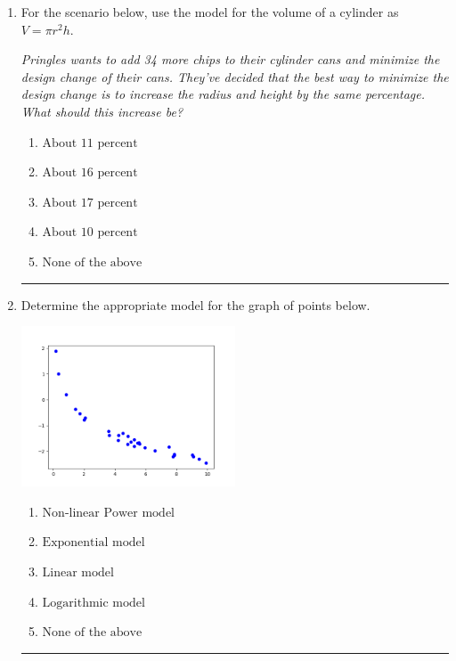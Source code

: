 \documentclass[14pt]{extbook}
\newcommand{\litem}[1]{\item#1\hspace*{-1cm}\rule{\textwidth}{0.4pt}}
\begin{document}
\begin{enumerate}
{\begin{enumerate}[label=\Alph*.]
\end{enumerate} }
\litem{
For the scenario below, use the model for the volume of a cylinder as $V = \pi r^2 h$.
\begin{center}
    \textit{ Pringles wants to add 34 \text{percent} more chips to their cylinder cans and minimize the design change of their cans. They've decided that the best way to minimize the design change is to increase the radius and height by the same percentage. What should this increase be? }
\end{center}
\begin{enumerate}[label=\Alph*.]
\item \( \text{About } 11 \text{ percent} \)
\item \( \text{About } 16 \text{ percent} \)
\item \( \text{About } 17 \text{ percent} \)
\item \( \text{About } 10 \text{ percent} \)
\item \( \text{None of the above} \)

\end{enumerate} }
\litem{
Determine the appropriate model for the graph of points below.
\begin{center}
    \includegraphics[width=0.5\textwidth]{../Figures/identifyModelGraph12CopyC.png}
\end{center}
\begin{enumerate}[label=\Alph*.]
\item \( \text{Non-linear Power model} \)
\item \( \text{Exponential model} \)
\item \( \text{Linear model} \)
\item \( \text{Logarithmic model} \)
\item \( \text{None of the above} \)


\end{enumerate}}
\end{enumerate}
\end{document}
